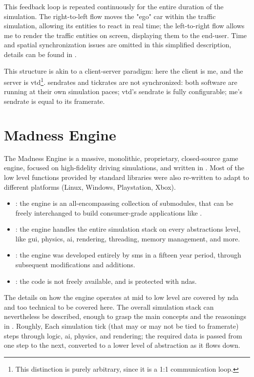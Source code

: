 This feedback loop is repeated continuously for the entire duration of the simulation. The right-to-left flow moves the "ego" car within the traffic simulation, allowing its entities to react in real time; the left-to-right flow allows \gls{me} to render the traffic entities on screen, displaying them to the end-user. Time and spatial synchronization issues are omitted in this simplified description, details can be found in . %

This structure is akin to a client-server paradigm: here the client is \gls{me}, and the server is \gls{vtd}\footnote{This distinction is purely arbitrary, since it is a 1:1 communication loop.}. \Glspl{sendrate} and \glspl{tickrate} are not synchronized: both software are running at their own simulation paces; \gls{vtd}'s sendrate is fully configurable; \gls{me}'s sendrate is equal to its framerate.

\section{Madness Engine}\label{sc:software:madnessengine}

The Madness Engine is a massive, monolithic, proprietary, closed-source game engine, focused on high-fidelity driving simulations, and written in . Most of the low level functions provided by standard libraries were also re-written to adapt to different platforms (Linux, Windows, Playstation, Xbox).

\begin{itemize}
	\item {}: the engine is an all-encompassing collection of submodules, that can be freely interchanged to build consumer-grade applications like .
	\item {}: the engine handles the entire simulation stack on every abstractions level, like \gls{gui}, physics, \gls{ai}, rendering, threading, memory management, and more.
	\item {}: the engine was developed entirely by \gls{sms} in a fifteen year period, through subsequent modifications and additions.
	\item {}: the code is not freely available, and is protected with \glspl{nda}.
\end{itemize}

The details on how the engine operates at mid to low level are covered by \gls{nda} and too technical to be covered here. The overall simulation stack can nevertheless be described, enough to grasp the main concepts and the reasonings in . Roughly, Each simulation tick (that may or may not be tied to framerate) steps through logic, \gls{ai}, physics, and rendering; the required data is passed from one step to the next, converted to a lower level of abstraction as it flows down.

